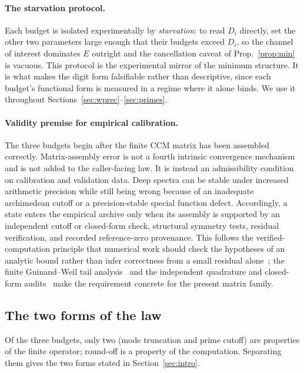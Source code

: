 \documentclass[11pt,a4paper]{article}
\begin{document}
\paragraph{The starvation protocol.}
Each budget is isolated experimentally by \emph{starvation}: to read $D_i$
directly, set the other two parameters large enough that their budgets exceed
$D_i$, so the channel of interest dominates $E$ outright and the cancellation
caveat of Prop.~\ref{prop:min} is vacuous. This protocol is the
experimental mirror of the minimum structure. It is what makes the digit form
falsifiable rather than descriptive, since each budget's functional form is
measured in a regime where it alone binds. We use it throughout
Sections~\ref{sec:wprec}--\ref{sec:primes}.

\paragraph{Validity premise for empirical calibration.}
The three budgets begin after the finite CCM matrix has been assembled
correctly. Matrix-assembly error is not a fourth intrinsic convergence
mechanism and is not added to the caller-facing law. It is instead an
admissibility condition on calibration and validation data. Deep spectra can
be stable under increased arithmetic precision while still being wrong
because of an inadequate archimedean cutoff or a precision-stable special
function defect. Accordingly, a state enters the empirical archive only when
its assembly is supported by an independent cutoff or closed-form check,
structural symmetry tests, residual verification, and recorded reference-zero
provenance. This follows the verified-computation principle that numerical
work should check the hypotheses of an analytic bound rather than infer
correctness from a small residual alone~\cite{Rump2010}; the finite
Guinand--Weil tail analysis~\cite{GroskinGW2026} and the independent
quadrature and closed-form audits~\cite{AndradeQuadrature2026,AndradeClosedForm2026}
make the requirement concrete for the present matrix family.

\subsection{The two forms of the law}\label{ssec:twoforms}

Of the three budgets, only two (mode truncation and prime cutoff) are
properties of the finite operator; round-off is a property of the computation.
Separating them gives the two forms stated in Section~\ref{sec:intro}.
\end{document}
